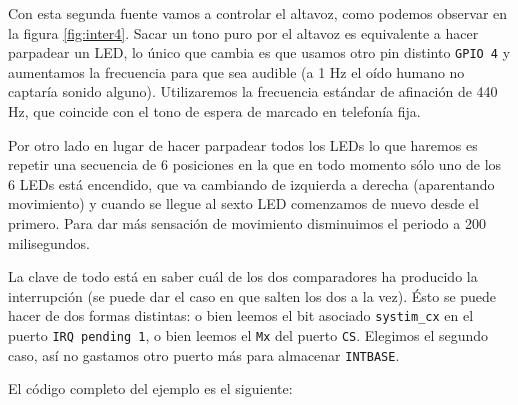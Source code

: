 Con esta segunda fuente vamos a controlar el altavoz, como podemos
observar en la figura \ref{fig:inter4}. Sacar un tono
puro por el altavoz es equivalente a hacer parpadear un LED, lo único que cambia es que usamos
otro pin distinto {\tt GPIO 4} y aumentamos la frecuencia para que sea audible (a 1 Hz el oído
humano no captaría sonido alguno). Utilizaremos la frecuencia estándar de afinación
de 440 Hz, que coincide con el tono de espera de marcado en telefonía fija.

Por otro lado en lugar de hacer parpadear todos los LEDs lo que haremos es repetir una
secuencia de 6 posiciones en la que en todo momento sólo uno de los 6 LEDs está encendido, que
va cambiando de izquierda a derecha (aparentando movimiento) y cuando se llegue al sexto LED
comenzamos de nuevo desde el primero. Para dar más sensación de movimiento disminuimos el periodo
a 200 milisegundos.

La clave de todo está en saber cuál de los dos comparadores ha producido la interrupción (se
puede dar el caso en que salten los dos a la vez). Ésto se puede hacer de dos formas distintas:
o bien leemos el bit asociado {\tt systim\_cx} en el puerto {\tt IRQ pending 1}, o bien leemos
el {\tt Mx} del puerto {\tt CS}. Elegimos el segundo caso, así no gastamos otro puerto más
para almacenar {\tt INTBASE}.

\newpage
El código completo del ejemplo es el siguiente:

